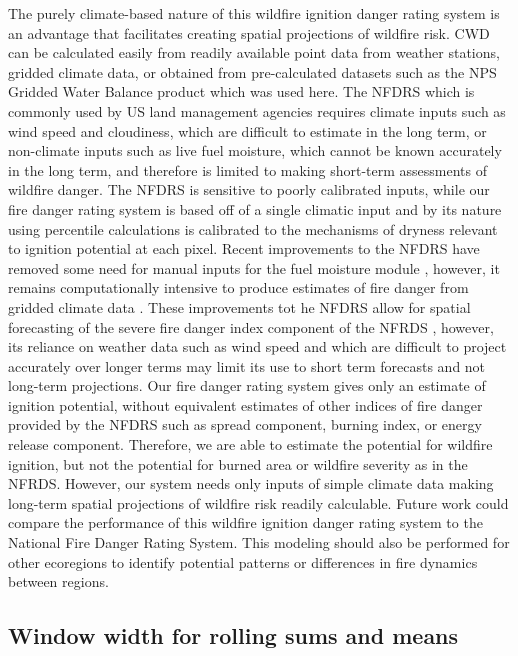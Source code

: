 \documentclass[11p]{article}
\begin{document}
The purely climate-based nature of this wildfire ignition danger rating system is an advantage that facilitates creating spatial projections of wildfire risk. CWD can be calculated easily from readily available point data from weather stations, gridded climate data, or obtained from pre-calculated datasets such as the NPS Gridded Water Balance product \citep{tercekHistoricalChangesPlant2021} which was used here. The NFDRS \citep{degrootChapter11Wildland2015} which is commonly used by US land management agencies requires climate inputs such as wind speed and cloudiness, which are difficult to estimate in the long term, or non-climate inputs such as live fuel moisture, which cannot be known accurately in the long term, and therefore is limited to making short-term assessments of wildfire danger. The NFDRS is sensitive to poorly calibrated inputs, while our fire danger rating system is based off of a single climatic input and by its nature using percentile calculations is calibrated to the mechanisms of dryness relevant to ignition potential at each pixel. Recent improvements to the NFDRS have removed some need for manual inputs for the fuel moisture module \citep{jollyModernizingUSNational2024}, however, it remains computationally intensive to produce estimates of fire danger from gridded climate data \citep{farguellFastSpatialNFDRS2025a}. These improvements tot he NFDRS allow for spatial forecasting of the severe fire danger index component of the NFRDS \citep{jollySevereFireDanger2019}, however, its reliance on weather data such as wind speed and which are difficult to project accurately over longer terms may limit its use to short term forecasts and not long-term projections. Our fire danger rating system gives only an estimate of ignition potential, without equivalent estimates of other indices of fire danger provided by the NFDRS such as spread component, burning index, or energy release component. Therefore, we are able to estimate the potential for wildfire ignition, but not the potential for burned area or wildfire severity as in the NFRDS. However, our system needs only inputs of simple climate data making long-term spatial projections of wildfire risk readily calculable. Future work could compare the performance of this wildfire ignition danger rating system to the National Fire Danger Rating System. This modeling should also be performed for other ecoregions to identify potential patterns or differences in fire dynamics between regions. 


\subsection{Window width for rolling sums and means}
\end{document}
